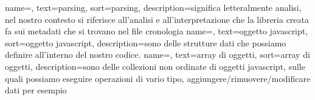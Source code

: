 {
  name=,
  text=parsing,
  sort=parsing,
  description={significa letteralmente analisi, nel nostro contesto si riferisce all'analisi e all'interpretazione che la libreria creata fa sui metadati che si trovano nel file cronologia}
}
{
  name=,
  text=oggetto javascript,
  sort=oggetto javascript,
  description={sono delle strutture dati che possiamo definire all'interno del nostro codice.}
}
{
  name=,
  text=array di oggetti,
  sort=array di oggetti,
  description={sono delle collezioni non ordinate di oggetti javascript, sulle quali possiamo eseguire operazioni di vario tipo, aggiungere/rimuovere/modificare dati per esempio}
}



